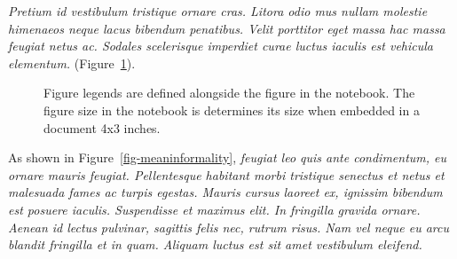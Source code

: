 \documentclass[
  a4paper,
]{scrbook}
\begin{document}
\emph{Pretium id vestibulum tristique ornare cras. Litora odio mus
nullam molestie himenaeos neque lacus bibendum penatibus. Velit
porttitor eget massa hac massa feugiat netus ac. Sodales scelerisque
imperdiet curae luctus iaculis est vehicula elementum.}
(Figure~\ref{fig-danishinteraction}).

\begin{figure}[H]


\caption{\label{fig-danishinteraction}Figure legends are defined
alongside the figure in the notebook. The figure size in the notebook is
determines its size when embedded in a document 4x3 inches.}

\end{figure}%

As shown in Figure~\ref{fig-meaninformality}, \emph{feugiat leo quis
ante condimentum, eu ornare mauris feugiat. Pellentesque habitant morbi
tristique senectus et netus et malesuada fames ac turpis egestas. Mauris
cursus laoreet ex, ignissim bibendum est posuere iaculis. Suspendisse et
maximus elit. In fringilla gravida ornare. Aenean id lectus pulvinar,
sagittis felis nec, rutrum risus. Nam vel neque eu arcu blandit
fringilla et in quam. Aliquam luctus est sit amet vestibulum eleifend.}
\end{document}

